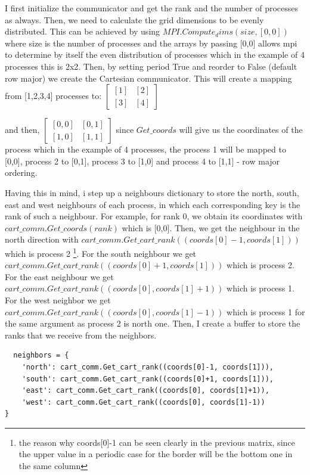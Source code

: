 \documentclass[unicode,11pt,a4paper,oneside,numbers=endperiod,openany]{scrartcl}
\begin{document}
I first initialize the communicator and get the rank and the number of processes as always. Then, we need to calculate the grid dimensions to be evenly distributed. This can be achieved 
by using $MPI.Compute_dims(size, [0,0])$ where size is the number of processes and the arrays by passing [0,0] allows mpi to determine by itself
the even distribution of processes which in the example of 4 processes this is 2x2. 
Then, by setting period True and reorder to False (default row major) we create the Cartesian communicator.
This will create a mapping from [1,2,3,4] processes to:
$\begin{bmatrix}
[1] & [2] \\
[3] & [4]
\end{bmatrix}$ 

and then, $\begin{bmatrix}
          [0,0] & [0,1] \\
          [1,0] & [1,1]
          \end{bmatrix}$  since $Get\_coords$ will give us the coordinates of the process which in the example of 4 processes, the process 1 will be mapped to [0,0], process 2 to [0,1], process 3 to [1,0] and process 4 to [1,1] - row major ordering.

Having this in mind, i step up a neighbours dictionary to store the north, south, east and west neighbours of each process, in which each corresponding key is the rank of such a neighbour. For example, for 
rank 0, we obtain its coordinates with $cart\_comm.Get\_coords(rank)$ which is [0,0]. Then, we get the neighbour in the north direction with $cart\_comm.Get\_cart\_rank((coords[0]-1, coords[1]))$ which is process 2 \footnote{
  the reason why coords[0]-1 can be seen clearly in the previous matrix, since the upper value in a periodic case for the border will be the bottom one in the same column
}. For the south neighbour we get $cart\_comm.Get\_cart\_rank((coords[0]+1, coords[1]))$ which is process 2. For the east neighbour we get $cart\_comm.Get\_cart\_rank((coords[0], coords[1]+1))$ which is process 1.
For the west neighbor we get $cart\_comm.Get\_cart\_rank((coords[0], coords[1]-1))$ which is process 1 for the same argument as process 2 is north one.
Then, I create a buffer to store the ranks that we receive from the neighbors.

\begin{verbatim}
  neighbors = {
    'north': cart_comm.Get_cart_rank((coords[0]-1, coords[1])), 
    'south': cart_comm.Get_cart_rank((coords[0]+1, coords[1])),
    'east': cart_comm.Get_cart_rank((coords[0], coords[1]+1)),
    'west': cart_comm.Get_cart_rank((coords[0], coords[1]-1))
}
\end{verbatim}
\end{document}
